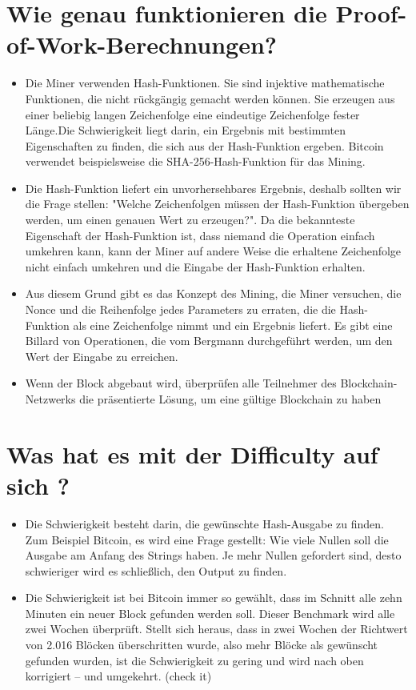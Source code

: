 \documentclass[ngerman]{scrreprt}
\begin{document}
\section{Wie genau funktionieren die Proof-of-Work-Berechnungen?}
\begin{itemize}
	\item {Die Miner verwenden Hash-Funktionen. Sie sind injektive mathematische Funktionen, die nicht rückgängig gemacht werden können. Sie erzeugen aus einer beliebig langen Zeichenfolge eine eindeutige Zeichenfolge fester Länge.Die Schwierigkeit liegt darin, ein Ergebnis mit bestimmten Eigenschaften zu finden, die sich aus der Hash-Funktion ergeben. Bitcoin verwendet beispielsweise die SHA-256-Hash-Funktion für das Mining.}
	\item{Die Hash-Funktion liefert ein unvorhersehbares Ergebnis, deshalb sollten wir die Frage stellen: "Welche Zeichenfolgen müssen der Hash-Funktion übergeben werden, um einen genauen Wert zu erzeugen?". Da die bekannteste Eigenschaft der Hash-Funktion ist, dass niemand die Operation einfach umkehren kann, kann der Miner auf andere Weise die erhaltene Zeichenfolge nicht einfach umkehren und die Eingabe der Hash-Funktion erhalten.}
	\item{Aus diesem Grund gibt es das Konzept des Mining, die Miner versuchen, die Nonce und die Reihenfolge jedes Parameters zu erraten, die die Hash-Funktion als eine Zeichenfolge nimmt und ein Ergebnis liefert. Es gibt eine Billard von Operationen, die vom Bergmann durchgeführt werden, um den Wert der Eingabe zu erreichen.}
	\item{Wenn der Block abgebaut wird, überprüfen alle Teilnehmer des Blockchain-Netzwerks die präsentierte Lösung, um eine gültige Blockchain zu haben}
\end{itemize}
\section{Was hat es mit der Difficulty auf sich ?}
\begin{itemize}
\item{Die Schwierigkeit besteht darin, die gewünschte Hash-Ausgabe zu finden. Zum Beispiel Bitcoin, es wird eine Frage gestellt: Wie viele Nullen soll die Ausgabe am Anfang des Strings haben. Je mehr Nullen gefordert sind, desto schwieriger wird es schließlich, den Output zu finden.}
\item{Die Schwierigkeit ist bei Bitcoin immer so gewählt, dass im Schnitt alle zehn Minuten ein neuer Block gefunden werden soll. Dieser Benchmark wird alle zwei Wochen überprüft. Stellt sich heraus, dass in zwei Wochen der Richtwert von 2.016 Blöcken überschritten wurde, also mehr Blöcke als gewünscht gefunden wurden, ist die Schwierigkeit zu gering und wird nach oben korrigiert – und umgekehrt. (check it)}
\end{itemize}
\end{document}
